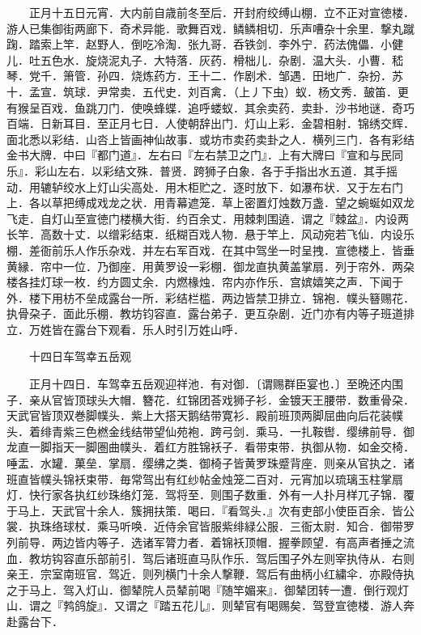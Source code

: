 　　正月十五日元宵．大内前自歳前冬至后．开封府绞缚山棚．立不正对宣徳楼．游人已集御街两廊下．奇术异能．歌舞百戏．鳞鳞相切．乐声嘈杂十余里．撃丸蹴踘．踏索上竿．赵野人．倒吃冷淘．张九哥．呑铁剑．李外宁．药法傀儡．小健儿．吐五色水．旋烧泥丸子．大特落．灰药．榾柮儿．杂剧．温大头．小曹．嵇琴．党千．箫管．孙四．烧炼药方．王十二．作剧术．邹遇．田地广．杂扮．苏十．孟宣．筑球．尹常卖．五代史．刘百禽．（上丿下虫）蚁．杨文秀．皷笛．更有猴呈百戏．鱼跳刀门．使唤蜂蝶．追呼蝼蚁．其余卖药．卖卦．沙书地谜．奇巧百端．日新耳目．至正月七日．人使朝辞出门．灯山上彩．金碧相射．锦绣交辉．面北悉以彩结．山呇上皆画神仙故事．或坊市卖药卖卦之人．横列三门．各有彩结金书大牌．中曰『都门道』．左右曰『左右禁卫之门』．上有大牌曰『宣和与民同乐』．彩山左右．以彩结文殊．普贤．跨狮子白象．各于手指出水五道．其手摇动．用辘轳绞水上灯山尖高处．用木柜贮之．逐时放下．如瀑布状．又于左右门上．各以草把缚成戏龙之状．用青幕遮笼．草上密置灯烛数万盏．望之蜿蜒如双龙飞走．自灯山至宣徳门楼横大街．约百余丈．用棘刺围遶．谓之『棘盆』．内设两长竿．高数十丈．以缯彩结束．纸糊百戏人物．悬于竿上．风动宛若飞仙．内设乐棚．差衙前乐人作乐杂戏．并左右军百戏．在其中驾坐一时呈拽．宣徳楼上．皆垂黄縁．帘中一位．乃御座．用黄罗设一彩棚．御龙直执黄盖掌扇．列于帘外．两朶楼各挂灯球一枚．约方圆丈余．内燃椽烛．帘内亦作乐．宫嫔嬉笑之声．下闻于外．楼下用枋不垒成露台一所．彩结栏槛．两边皆禁卫排立．锦袍．幞头簮赐花．执骨朶子．面此乐棚．教坊钧容直．露台弟子．更互杂剧．近门亦有内等子班道排立．万姓皆在露台下观看．乐人时引万姓山呼．

　　十四日车驾幸五岳观

　　正月十四日．车驾幸五岳观迎祥池．有对御．〔谓赐群臣宴也．〕至晩还内围子．亲从官皆顶球头大帽．簪花．红锦团荅戏狮子衫．金镀天王腰带．数重骨朶．天武官皆顶双巻脚幞头．紫上大搭天鹅结带寛衫．殿前班顶两脚屈曲向后花装幞头．着绯青紫三色橪金线结带望仙苑袍．跨弓剑．乘马．一扎鞍辔．缨绋前导．御龙直一脚指天一脚圏曲幞头．着红方胜锦袄子．看带束带．执御从物．如金交椅．唾盂．水罐．菓垒．掌扇．缨绋之类．御椅子皆黄罗珠蹙背座．则亲从官执之．诸班直皆幞头锦袄束带．毎常驾出有红纱帖金烛笼二百对．元宵加以琉璃玉柱掌扇灯．快行家各执红纱珠络灯笼．驾将至．则围子数重．外有一人扑月样兀子锦．覆于马上．天武官十余人．簇拥扶策．喝曰．『看驾头．』次有吏部小使臣百余．皆公裳．执珠络球杖．乘马听唤．近侍余官皆服紫绯緑公服．三衙太尉．知合．御带罗列前导．两边皆内等子．选诸军膂力者．着锦袄顶帽．握拳顾望．有高声者捶之流血．教坊钩容直乐部前引．驾后诸班直马队作乐．驾后围子外左则宰执侍从．右则亲王．宗室南班官．驾近．则列横门十余人撃鞭．驾后有曲柄小红繍伞．亦殿侍执之于马上．驾入灯山．御辇院人员辇前喝『随竿媚来』．御辇团转一遭．倒行观灯山．谓之『鹁鸽旋』．又谓之『踏五花儿』．则辇官有喝赐矣．驾登宣徳楼．游人奔赴露台下．

